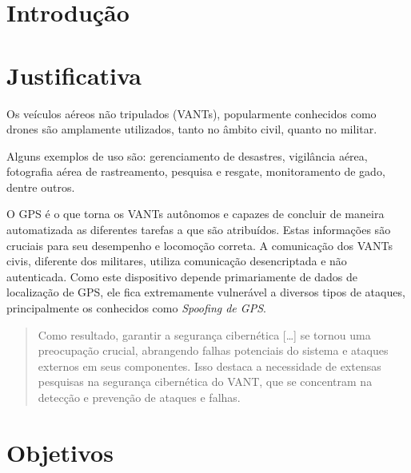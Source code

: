 \documentclass[12pt]{article}
\begin{document}
\section{Introdução}





\section{Justificativa}

Os veículos aéreos não tripulados (VANTs), popularmente conhecidos como drones são amplamente utilizados, tanto no âmbito civil, quanto no militar. \cite{capitanFrameworkHandleThreats2019}

Alguns exemplos de uso são: gerenciamento de desastres, vigilância aérea, fotografia aérea de rastreamento, pesquisa e resgate, monitoramento de gado, dentre outros. \cite{titounaLightweightSecurityTechnique2021}

O GPS é o que torna os VANTs autônomos e capazes de concluir de maneira automatizada as diferentes tarefas a que são atribuídos. Estas informações são cruciais para seu desempenho e locomoção correta. A comunicação dos VANTs civis, diferente dos militares, utiliza comunicação desencriptada e não autenticada. Como este dispositivo depende primariamente de dados de localização de GPS, ele fica extremamente vulnerável a diversos tipos de ataques, principalmente os conhecidos como \textit{Spoofing de GPS}. \cite{srinivasansGPSSpoofingDetection2023,titounaLightweightSecurityTechnique2021}

\begin{quote}
  Como resultado, garantir a segurança cibernética [\dots] se tornou uma preocupação crucial, abrangendo falhas potenciais do sistema e ataques externos em seus componentes. Isso destaca a necessidade de extensas pesquisas na segurança cibernética do VANT, que se concentram na detecção e prevenção de ataques e falhas.  \cite[tradução nossa]{elalamiDroneDefGANtGenerativeAIBased2024}
\end{quote}




\section{Objetivos}
\end{document}
